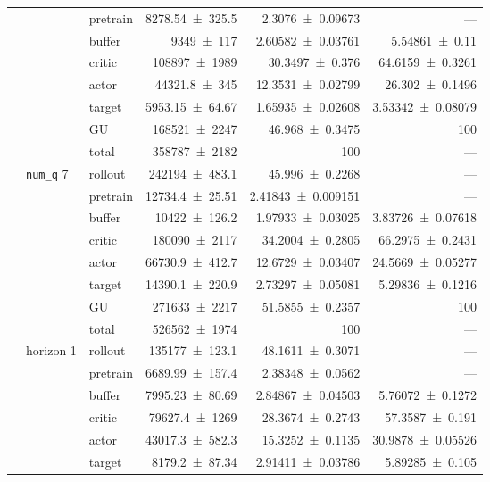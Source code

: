 {\begin{longtable}{@{}lllrrr@{}}
     &  & pretrain & \num{8278.54+-325.5} & \num{2.3076+-0.09673} & --- \\
     &  & buffer & \num{9349+-117} & \num{2.60582+-0.03761} & \num{5.54861+-0.11} \\
     &  & critic & \num{108897+-1989} & \num{30.3497+-0.376} & \num{64.6159+-0.3261} \\
     &  & actor & \num{44321.8+-345} & \num{12.3531+-0.02799} & \num{26.302+-0.1496} \\
     &  & target & \num{5953.15+-64.67} & \num{1.65935+-0.02608} & \num{3.53342+-0.08079} \\
     &  & GU & \num{168521+-2247} & \num{46.968+-0.3475} & 100 \\
     &  & total & \num{358787+-2182} & \num{100} & --- \\
    \addlinespace[2pt]
     & \texttt{num\_q} 7 & rollout & \num{242194+-483.1} & \num{45.996+-0.2268} & --- \\
     &  & pretrain & \num{12734.4+-25.51} & \num{2.41843+-0.009151} & --- \\
     &  & buffer & \num{10422+-126.2} & \num{1.97933+-0.03025} & \num{3.83726+-0.07618} \\
     &  & critic & \num{180090+-2117} & \num{34.2004+-0.2805} & \num{66.2975+-0.2431} \\
     &  & actor & \num{66730.9+-412.7} & \num{12.6729+-0.03407} & \num{24.5669+-0.05277} \\
     &  & target & \num{14390.1+-220.9} & \num{2.73297+-0.05081} & \num{5.29836+-0.1216} \\
     &  & GU & \num{271633+-2217} & \num{51.5855+-0.2357} & 100 \\
     &  & total & \num{526562+-1974} & \num{100} & --- \\
    \addlinespace[2pt]
     & horizon 1 & rollout & \num{135177+-123.1} & \num{48.1611+-0.3071} & --- \\
     &  & pretrain & \num{6689.99+-157.4} & \num{2.38348+-0.0562} & --- \\
     &  & buffer & \num{7995.23+-80.69} & \num{2.84867+-0.04503} & \num{5.76072+-0.1272} \\
     &  & critic & \num{79627.4+-1269} & \num{28.3674+-0.2743} & \num{57.3587+-0.191} \\
     &  & actor & \num{43017.3+-582.3} & \num{15.3252+-0.1135} & \num{30.9878+-0.05526} \\
     &  & target & \num{8179.2+-87.34} & \num{2.91411+-0.03786} & \num{5.89285+-0.105} \\

\end{longtable}}
